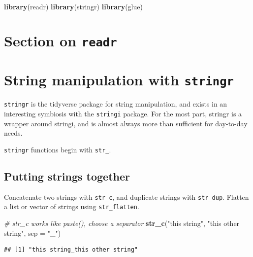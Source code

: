 \documentclass[]{book}
\newenvironment{Shaded}{}{}
\newcommand{\CommentTok}[1]{\textcolor[rgb]{0.38,0.63,0.69}{\textit{#1}}}
\newcommand{\DataTypeTok}[1]{\textcolor[rgb]{0.56,0.13,0.00}{#1}}
\newcommand{\KeywordTok}[1]{\textcolor[rgb]{0.00,0.44,0.13}{\textbf{#1}}}
\newcommand{\NormalTok}[1]{#1}
\newcommand{\StringTok}[1]{\textcolor[rgb]{0.25,0.44,0.63}{#1}}
\begin{document}
\begin{Shaded}
\begin{Highlighting}[]
\KeywordTok{library}\NormalTok{(readr)}
\KeywordTok{library}\NormalTok{(stringr)}
\KeywordTok{library}\NormalTok{(glue)}
\end{Highlighting}
\end{Shaded}

\hypertarget{section-on-readr}{%
\section{\texorpdfstring{Section on \texttt{readr}}{Section on readr}}\label{section-on-readr}}

\hypertarget{string-manipulation-with-stringr}{%
\section{\texorpdfstring{String manipulation with \texttt{stringr}}{String manipulation with stringr}}\label{string-manipulation-with-stringr}}

\texttt{stringr} is the tidyverse package for string manipulation, and exists in an interesting symbiosis with the \texttt{stringi} package. For the most part, stringr is a wrapper around stringi, and is almost always more than sufficient for day-to-day needs.

\texttt{stringr} functions begin with \texttt{str\_}.

\hypertarget{putting-strings-together}{%
\subsection{Putting strings together}\label{putting-strings-together}}

Concatenate two strings with \texttt{str\_c}, and duplicate strings with \texttt{str\_dup}. Flatten a list or vector of strings using \texttt{str\_flatten}.

\begin{Shaded}
\begin{Highlighting}[]
\CommentTok{# str_c works like paste(), choose a separator}
\KeywordTok{str_c}\NormalTok{(}\StringTok{"this string"}\NormalTok{, }\StringTok{"this other string"}\NormalTok{, }\DataTypeTok{sep =} \StringTok{"_"}\NormalTok{)}
\end{Highlighting}
\end{Shaded}

\begin{verbatim}
## [1] "this string_this other string"
\end{verbatim}
\end{document}
